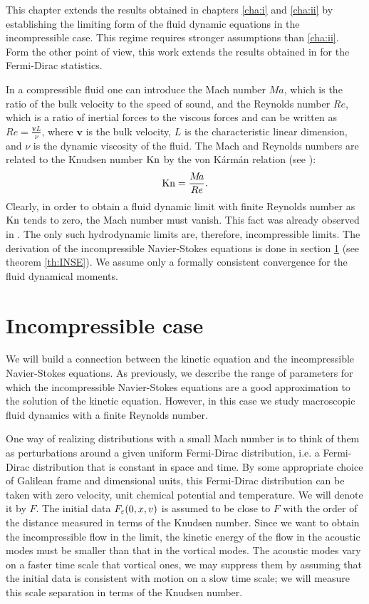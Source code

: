 This chapter extends the results obtained in chapters \ref{cha:i} and \ref{cha:ii} by establishing the limiting form of the fluid dynamic equations in the incompressible case. This regime requires stronger assumptions than \ref{cha:ii}. Form the other point of view, this work extends the results obtained in \cite{Bardos1991Fluid} for the Fermi-Dirac statistics.

In a compressible fluid one can introduce the Mach number $M\!a$, which is the ratio  of the bulk velocity to the speed of sound, and the Reynolds number $Re$, which is a ratio of inertial forces to the viscous forces and can be written as $Re = \frac{\mathbf vL}{\nu}$, where $\mathbf v$ is the bulk velocity, $L$ is the characteristic linear dimension, and $\nu$ is the dynamic viscosity of the fluid. The Mach and Reynolds numbers are related to the Knudsen number $\operatorname{Kn}$ by the von K\'arm\'an relation (see \cite{karman1923gastheoretische}): \begin{equation}\operatorname{Kn}=\frac{M\!a}{Re}.\end{equation}
Clearly, in order to obtain a fluid dynamic limit with finite Reynolds number as $\operatorname{Kn}$ tends to zero, the Mach number must vanish. This fact was already observed in \cite{Sone1969As}. The only such hydrodynamic limits are, therefore,  incompressible limits. The derivation of the incompressible Navier-Stokes equations is done in section \ref{section:INSE} (see theorem \ref{th:INSE}). We assume only  a formally consistent convergence for the fluid dynamical moments.%


\section{Incompressible case}
  \label{section:INSE}
We will build a connection between the kinetic equation and the incompressible Navier-Stokes equations. As previously, we describe the range of parameters for which the incompressible Navier-Stokes equations are a good approximation to the solution of the kinetic equation. However, in this case we study macroscopic fluid dynamics with a finite Reynolds number.

One way of realizing distributions with a small Mach number is to think of 
them as perturbations around a given uniform Fermi-Dirac distribution, i.e. a Fermi-Dirac distribution that  is
constant in space and time. By some appropriate choice of Galilean frame and
dimensional units, this Fermi-Dirac distribution can be taken with zero
velocity, unit chemical potential and temperature. We will denote
it by $F$. The initial data $F_{\varepsilon}(0,x,v)$ is assumed to be close to $F$
with the order of the distance measured in terms of the Knudsen number. Since we want to obtain the
incompressible flow in the limit, the kinetic energy of the flow in the acoustic modes must be
smaller than that in the vortical modes. The acoustic modes vary on a faster
time scale that vortical ones, we may suppress them by assuming that the
initial data is consistent with motion on a slow time scale; we will measure
this scale separation in terms of the Knudsen number.

